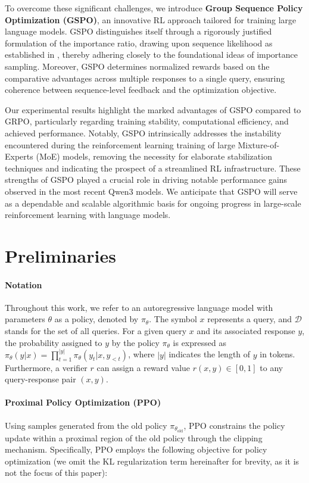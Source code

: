 To overcome these significant challenges, we introduce \textbf{Group Sequence Policy Optimization (GSPO)}, an innovative RL approach tailored for training large language models. GSPO distinguishes itself through a rigorously justified formulation of the importance ratio, drawing upon sequence likelihood as established in \citep{click}, thereby adhering closely to the foundational ideas of importance sampling. Moreover, GSPO determines normalized rewards based on the comparative advantages across multiple responses to a single query, ensuring coherence between sequence-level feedback and the optimization objective.

Our experimental results highlight the marked advantages of GSPO compared to GRPO, particularly regarding training stability, computational efficiency, and achieved performance. Notably, GSPO intrinsically addresses the instability encountered during the reinforcement learning training of large Mixture-of-Experts (MoE) models, removing the necessity for elaborate stabilization techniques and indicating the prospect of a streamlined RL infrastructure. These strengths of GSPO played a crucial role in driving notable performance gains observed in the most recent Qwen3 models. We anticipate that GSPO will serve as a dependable and scalable algorithmic basis for ongoing progress in large-scale reinforcement learning with language models.

\section{Preliminaries}

\paragraph{Notation}
Throughout this work, we refer to an autoregressive language model with parameters $\theta$ as a policy, denoted by $\pi_\theta$. The symbol $x$ represents a query, and $\mathcal{D}$ stands for the set of all queries. For a given query $x$ and its associated response $y$, the probability assigned to $y$ by the policy $\pi_\theta$ is expressed as $\pi_\theta (y | x)=\prod_{t=1}^{|y|} \pi_\theta (y_t | x, y_{<t} )$, where $|y|$ indicates the length of $y$ in tokens. Furthermore, a verifier $r$ can assign a reward value $r(x, y) \in [0, 1]$ to any query-response pair $(x, y)$.

\paragraph{Proximal Policy Optimization (PPO)} Using samples generated from the old policy $\pi_{\theta_\text{old}}$, PPO \citep{ppo} constrains the policy update within a proximal region of the old policy through the clipping mechanism. Specifically, PPO employs the following objective for policy optimization (we omit the KL regularization term hereinafter for brevity, as it is not the focus of this paper):

